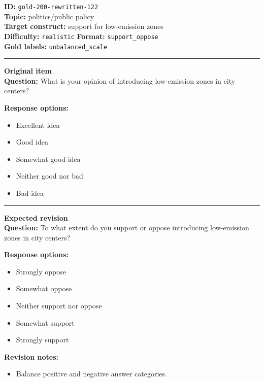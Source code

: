 \documentclass[10pt,a4paper]{article}
\newcommand{\sectionline}{\vspace{0.15em}\hrule\vspace{0.35em}}
\begin{document}
\begin{tcolorbox}[colframe=FlawRed,colback=white,colbacktitle=FlawRed!9,coltitle=black,title={Item 122\hfill Flawed item}]
\textbf{ID:} \texttt{gold-200-rewritten-122}\\
\textbf{Topic:} politics/public policy\\
\textbf{Target construct:} support for low-emission zones\\
\textbf{Difficulty:} \texttt{realistic} \quad \textbf{Format:} \texttt{support\_oppose}\\
\textbf{Gold labels:} \texttt{unbalanced\_scale}\\
\sectionline
\textbf{Original item}\\
\textbf{Question:} What is your opinion of introducing low-emission zones in city centers?
\par\textbf{Response options:}
\begin{itemize}
\item Excellent idea
\item Good idea
\item Somewhat good idea
\item Neither good nor bad
\item Bad idea
\end{itemize}
\sectionline
\textbf{Expected revision}\\
\textbf{Question:} To what extent do you support or oppose introducing low-emission zones in city centers?
\par\textbf{Response options:}
\begin{itemize}
\item Strongly oppose
\item Somewhat oppose
\item Neither support nor oppose
\item Somewhat support
\item Strongly support
\end{itemize}
\par\textbf{Revision notes:}
\begin{itemize}
\item Balance positive and negative answer categories.
\end{itemize}
\end{tcolorbox}
\end{document}
